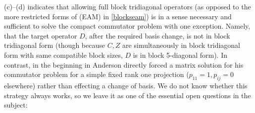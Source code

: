 \documentclass[10pt,reqno]{amsart}
\theoremstyle{remark}
\numberwithin{equation}{section}
\begin{document}
(c)--(d) indicates that allowing full block tridiagonal operators (as opposed to the more restricted forms of (EAM) in \eqref{blockseam}) is in a sense necessary and sufficient to solve the compact commutator problem with one exception.
Namely, that the target operator $D$, after the required basis change, is not in block tridiagonal form (though because $C,Z$ are simultaneously in block tridiagonal form with same compatible block sizes, $D$ is in block 5-diagonal form).
In contrast, in the beginning in \cite{And-1977-JRAM} Anderson directly forced a matrix solution for his commutator problem for a simple fixed rank one projection ($p_{11}=1, p_{ij} = 0$ elsewhere) rather than effecting a change of basis.
We do not know whether this strategy always works, so we leave it as one of the essential open questions in the subject:
\end{document}
